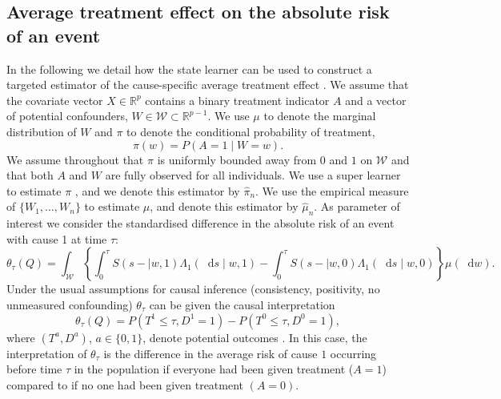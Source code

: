 \documentclass[11pt]{article}
\theoremstyle{thmstyleone}%
\theoremstyle{thmstyletwo}%
\theoremstyle{thmstylethree}%
\newcommand{\R}{\mathbb{R}}
\newcommand*\diff{\mathop{}\!\mathrm{d}}
\newcommand{\1}{\mathds{1}}
\begin{document}
\subsection{Average treatment effect on the absolute risk of an event}
\label{sec:cause-spec-aver}

In the following we detail how the state learner can be used to
construct a targeted estimator of the cause-specific average treatment
effect \citep{rytgaard2022targeted}. We assume that the covariate
vector \( X \in \R^p \) contains a binary treatment indicator \( A \)
and a vector of potential confounders,
\( W \in \mathcal{W}\subset \R^{p-1} \).  We use $\mu$ to denote the
marginal distribution of \( W \) and $\pi$ to denote the conditional
probability of treatment,
\begin{equation*}
  \pi(w) = P(A=1 \mid W=w).
\end{equation*}
We assume throughout that $\pi$ is uniformly bounded away from \( 0 \)
and \( 1 \) on \( \mathcal{W} \) and that both \( A \) and \( W \) are
fully observed for all individuals. We use a super learner to
estimate $\pi$ \citep{Polley_Ledell_Kennedy_Laan_2023_Superlearn}, and
we denote this estimator by $\hat{\pi}_n$. We use the empirical
measure of \( \{W_1, \dots, W_n\} \) to estimate $\mu$, and denote
this estimator by $\hat{\mu}_n$. As parameter of interest we consider
the standardised difference in the absolute risk of an event with
cause 1 at time $\tau$:
\begin{equation*}
  \theta_{{\tau}}(Q) = \int_{\mathcal{W}} 
  \left\{
    \int_0^{\tau}
    S(s- \mid w, 1)  \Lambda_1(\diff s \mid w, 1)
    -
    \int_0^{\tau}
    S(s- \mid w, 0)  \Lambda_1(\diff s \mid w, 0)
  \right\}
  \mu(\diff w).
\end{equation*}
Under the usual assumptions for causal inference (consistency,
positivity, no unmeasured confounding) \( \theta_{{\tau}} \) can be
given the causal interpretation
\begin{equation*}
  \theta_{{\tau}}(Q) =
  P{(T^{1} \leq \tau, D^{1}=1)}-
  P{(T^{0} \leq \tau, D^{0}=1)},
\end{equation*}
where \( (T^a, D^a) \), \( a \in \{0,1\} \), denote potential outcomes
\citep{hernanRobinsWhatIf}. In this case, the interpretation of $\theta_{\tau}$
is the difference in the average risk of cause \( 1 \) occurring before time
\( \tau \) in the population if everyone had been given treatment (\( A=1 \))
compared to if no one had been given treatment \( (A=0) \).
\end{document}
